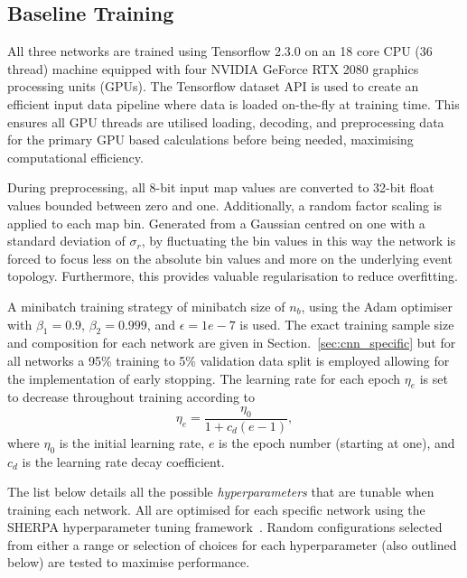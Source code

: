 \subsection{Baseline Training} %
\label{sec:cnn_baseline_training} %

All three networks are trained using Tensorflow 2.3.0 on an 18 core CPU (36 thread) machine
equipped with four NVIDIA GeForce RTX 2080 graphics processing units (GPUs). The Tensorflow
dataset API is used to create an efficient input data pipeline where data is loaded on-the-fly at
training time. This ensures all GPU threads are utilised loading, decoding, and preprocessing data
for the primary GPU based calculations before being needed, maximising computational efficiency.

During preprocessing, all 8-bit input map values are converted to 32-bit float values bounded
between zero and one. Additionally, a random factor scaling is applied to each map bin. Generated
from a Gaussian centred on one with a standard deviation of $\sigma_{r}$, by fluctuating the bin
values in this way the network is forced to focus less on the absolute bin values and more on the
underlying event topology. Furthermore, this provides valuable regularisation to reduce
overfitting.

A minibatch training strategy of minibatch size of $n_{b}$, using the Adam
optimiser~\cite{kingma2014} with $\beta_{1}=0.9$, $\beta_{2}=0.999$, and $\epsilon = 1e-7$ is
used. The exact training sample size and composition for each network are given in
Section.~\ref{sec:cnn_specific} but for all networks a 95\% training to 5\% validation data split
is employed allowing for the implementation of early stopping. The learning rate for each epoch
$\eta_{e}$ is set to decrease throughout training according to
\begin{equation}
    \eta_{e}=\frac{\eta_{0}}{1+c_{d}(e-1)},
\end{equation}
where $\eta_{0}$ is the initial learning rate, $e$ is the epoch number (starting at one), and
$c_{d}$ is the learning rate decay coefficient.

The list below details all the possible \emph{hyperparameters} that are tunable when training each
network. All are optimised for each specific network using the SHERPA hyperparameter tuning
framework~\cite{hertel2020}. Random configurations selected from either a range or selection of
choices for each hyperparameter (also outlined below) are tested to maximise performance.

